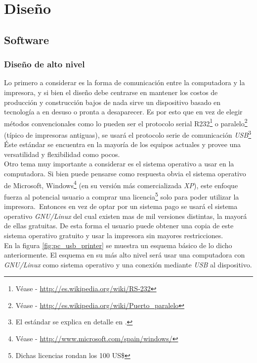 \chapter{Dise\~no}
%

\section{Software}
\subsection{Dise\~no de alto nivel}
%
Lo primero a considerar es la forma de comunicaci\'on entre la computadora y
la impresora, y si bien el dise\~no debe centrarse en mantener los costos de
producci\'on y construcci\'on bajos de nada sirve un dispositivo basado en
tecnolog\'ia a en desuso o pronta a desaparecer. Es por esto que en vez de
elegir m\'etodos convencionales como lo pueden ser el protocolo serial
R232\footnote{V\'ease - \url{http://es.wikipedia.org/wiki/RS-232}} o
paralelo\footnote{V\'ease - \url{http://es.wikipedia.org/wiki/Puerto_paralelo}}
(t\'ipico de impresoras antiguas), se usar\'a el protocolo serie de
comunicaci\'on \emph{USB}\footnote{El est\'andar se explica en detalle en
.} \'Este est\'andar se encuentra en la mayor\'ia de los
equipos actuales y provee una versatilidad y flexibilidad como pocos.\\

Otro tema muy importante a considerar es el sistema operativo a usar en la
computadora. Si bien puede pensarse como respuesta obvia el sistema operativo
de Microsoft,
Windows\footnote{V\'ease - \url{http://www.microsoft.com/spain/windows/}} (en
su versi\'on m\'as comercializada \emph{XP}), este enfoque fuerza al potencial
usuario a comprar una licencia\footnote{Dichas licencias rondan los 100 US\$}
solo para poder utilizar la impresora.\
Entonces en vez de optar por un sistema pago se usar\'a el sistema
operativo \emph{GNU/Linux}
del cual existen mas de mil versiones distintas, la mayor\'a de ellas
gratuitas.
De esta forma el usuario puede obtener una copia de este sistema operativo
gratuito y usar la impresora sin mayores restricciones.\\

En la figura \ref{fig:pc_usb_printer} se muestra un esquema b\'asico de lo
dicho
anteriormente. El esquema en su m\'as alto nivel ser\'a usar una computadora
con \emph{GNU/Linux} como sistema operativo y una conexi\'on mediante
\emph{USB} al dispositivo.

